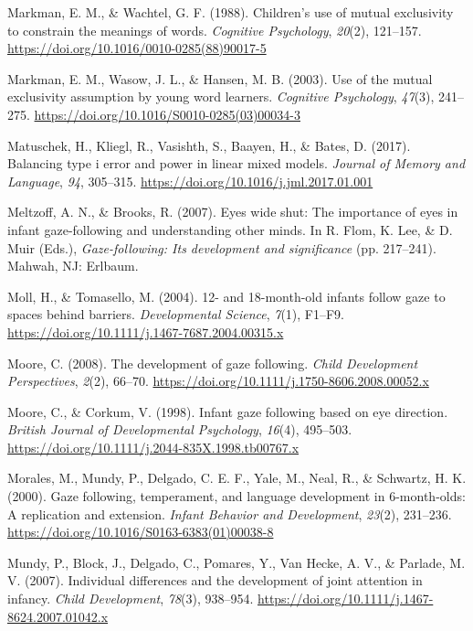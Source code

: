 \documentclass[
  english,
  ,man,floatsintext]{apa6}
\begin{document}
\leavevmode\hypertarget{ref-Markman_Wachtel_1988}{}%
Markman, E. M., \& Wachtel, G. F. (1988). Children's use of mutual exclusivity to constrain the meanings of words. \emph{Cognitive Psychology}, \emph{20}(2), 121--157. \url{https://doi.org/10.1016/0010-0285(88)90017-5}

\leavevmode\hypertarget{ref-Markman_etal_2003}{}%
Markman, E. M., Wasow, J. L., \& Hansen, M. B. (2003). Use of the mutual exclusivity assumption by young word learners. \emph{Cognitive Psychology}, \emph{47}(3), 241--275. \url{https://doi.org/10.1016/S0010-0285(03)00034-3}

\leavevmode\hypertarget{ref-Matuschek_etal_2017}{}%
Matuschek, H., Kliegl, R., Vasishth, S., Baayen, H., \& Bates, D. (2017). Balancing type i error and power in linear mixed models. \emph{Journal of Memory and Language}, \emph{94}, 305--315. \url{https://doi.org/10.1016/j.jml.2017.01.001}

\leavevmode\hypertarget{ref-Meltzoff_Brooks_2007}{}%
Meltzoff, A. N., \& Brooks, R. (2007). Eyes wide shut: The importance of eyes in infant gaze-following and understanding other minds. In R. Flom, K. Lee, \& D. Muir (Eds.), \emph{Gaze-following: Its development and significance} (pp. 217--241). Mahwah, NJ: Erlbaum.

\leavevmode\hypertarget{ref-Moll_Tomasello_2004}{}%
Moll, H., \& Tomasello, M. (2004). 12- and 18-month-old infants follow gaze to spaces behind barriers. \emph{Developmental Science}, \emph{7}(1), F1--F9. \url{https://doi.org/10.1111/j.1467-7687.2004.00315.x}

\leavevmode\hypertarget{ref-Moore_2008}{}%
Moore, C. (2008). The development of gaze following. \emph{Child Development Perspectives}, \emph{2}(2), 66--70. \url{https://doi.org/10.1111/j.1750-8606.2008.00052.x}

\leavevmode\hypertarget{ref-Moore_Corkum_1998}{}%
Moore, C., \& Corkum, V. (1998). Infant gaze following based on eye direction. \emph{British Journal of Developmental Psychology}, \emph{16}(4), 495--503. \url{https://doi.org/10.1111/j.2044-835X.1998.tb00767.x}

\leavevmode\hypertarget{ref-Morales_etal_2000}{}%
Morales, M., Mundy, P., Delgado, C. E. F., Yale, M., Neal, R., \& Schwartz, H. K. (2000). Gaze following, temperament, and language development in 6-month-olds: A replication and extension. \emph{Infant Behavior and Development}, \emph{23}(2), 231--236. \url{https://doi.org/10.1016/S0163-6383(01)00038-8}

\leavevmode\hypertarget{ref-Mundy_etal_2007}{}%
Mundy, P., Block, J., Delgado, C., Pomares, Y., Van Hecke, A. V., \& Parlade, M. V. (2007). Individual differences and the development of joint attention in infancy. \emph{Child Development}, \emph{78}(3), 938--954. \url{https://doi.org/10.1111/j.1467-8624.2007.01042.x}
\end{document}
